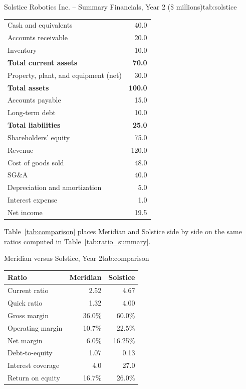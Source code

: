 \documentclass[../ai_in_finance]{subfiles}
\begin{document}
\begin{booktable}[htbp]{Solstice Robotics Inc. -- Summary Financials, Year 2 (\$ millions)}{tab:solstice}
\begin{tabular}{lr}
\toprule
Cash and equivalents & 40.0 \\
Accounts receivable & 20.0 \\
Inventory & 10.0 \\
\textbf{Total current assets} & \textbf{70.0} \\
Property, plant, and equipment (net) & 30.0 \\
\textbf{Total assets} & \textbf{100.0} \\
\midrule
Accounts payable & 15.0 \\
Long-term debt & 10.0 \\
\textbf{Total liabilities} & \textbf{25.0} \\
Shareholders' equity & 75.0 \\
\midrule
Revenue & 120.0 \\
Cost of goods sold & 48.0 \\
SG\&A & 40.0 \\
Depreciation and amortization & 5.0 \\
Interest expense & 1.0 \\
Net income & 19.5 \\
\bottomrule
\end{tabular}
\end{booktable}

Table~\ref{tab:comparison} places Meridian and Solstice side by side on the same ratios computed in Table~\ref{tab:ratio_summary}.

\begin{booktable}[htbp]{Meridian versus Solstice, Year 2}{tab:comparison}
\begin{tabular}{lrr}
\toprule
Ratio & Meridian & Solstice \\
\midrule
Current ratio & 2.52 & 4.67 \\
Quick ratio & 1.32 & 4.00 \\
Gross margin & 36.0\% & 60.0\% \\
Operating margin & 10.7\% & 22.5\% \\
Net margin & 6.0\% & 16.25\% \\
Debt-to-equity & 1.07 & 0.13 \\
Interest coverage & 4.0 & 27.0 \\
Return on equity & 16.7\% & 26.0\% \\
\bottomrule
\end{tabular}
\end{booktable}
\end{document}
